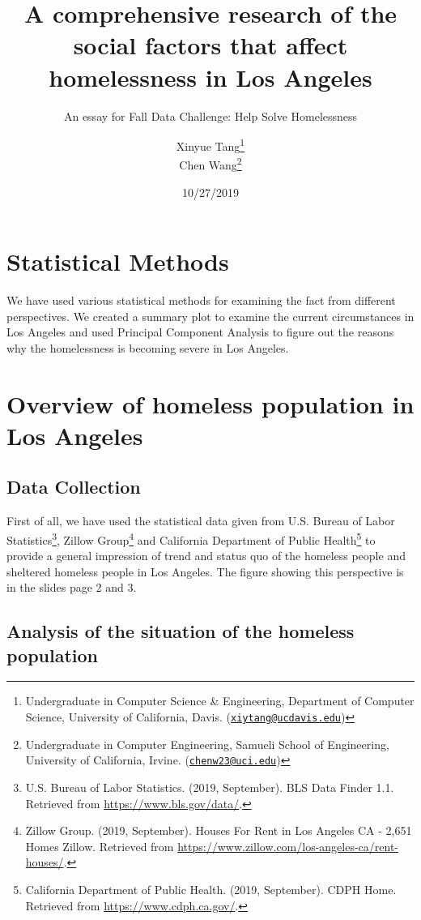 \documentclass[]{article}
\title{A comprehensive research of the social factors that affect homelessness
in Los Angeles}
\subtitle{An essay for Fall Data Challenge: Help Solve Homelessness}
\author{Xinyue Tang\footnote{Undergraduate in Computer Science \& Engineering,
  Department of Computer Science, University of California, Davis.
  (\href{mailto:xiytang@ucdavis.edu}{\nolinkurl{xiytang@ucdavis.edu}})} \\ Chen Wang\footnote{Undergraduate in Computer Engineering, Samueli School
  of Engineering, University of California, Irvine.
  (\href{mailto:chenw23@uci.edu}{\nolinkurl{chenw23@uci.edu}})}}
\date{10/27/2019}
\let\rmarkdownfootnote\footnote%
\def\footnote{\protect\rmarkdownfootnote}
\begin{document}
\maketitle

{
\setcounter{tocdepth}{3}
\tableofcontents
}
\newpage

\hypertarget{statistical-methods}{%
\section{Statistical Methods}\label{statistical-methods}}

We have used various statistical methods for examining the fact from
different perspectives. We created a summary plot to examine the current
circumstances in Los Angeles and used Principal Component Analysis to
figure out the reasons why the homelessness is becoming severe in Los
Angeles.

\hypertarget{overview-of-homeless-population-in-los-angeles}{%
\section{Overview of homeless population in Los
Angeles}\label{overview-of-homeless-population-in-los-angeles}}

\hypertarget{data-collection}{%
\subsection{Data Collection}\label{data-collection}}

First of all, we have used the statistical data given from U.S. Bureau
of Labor Statistics\footnote{U.S. Bureau of Labor Statistics. (2019,
  September). BLS Data Finder 1.1. Retrieved from
  \url{https://www.bls.gov/data/}.}, Zillow Group\footnote{Zillow Group.
  (2019, September). Houses For Rent in Los Angeles CA - 2,651 Homes
  \textbar{} Zillow. Retrieved from
  \url{https://www.zillow.com/los-angeles-ca/rent-houses/}.} and
California Department of Public Health\footnote{California Department of
  Public Health. (2019, September). CDPH Home. Retrieved from
  \url{https://www.cdph.ca.gov/}.} to provide a general impression of
trend and status quo of the homeless people and sheltered homeless
people in Los Angeles. The figure showing this perspective is in the
slides page 2 and 3.

\hypertarget{analysis-of-the-situation-of-the-homeless-population}{%
\subsection{Analysis of the situation of the homeless
population}\label{analysis-of-the-situation-of-the-homeless-population}}
\end{document}
